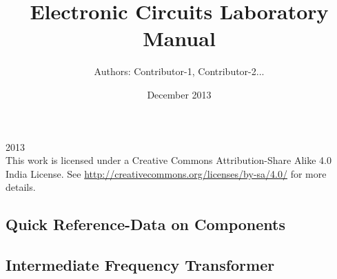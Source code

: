 \documentclass{book}
\begin{document}
\thispagestyle{empty}
\thispagestyle{empty}

\title{Electronic Circuits
Laboratory Manual}
\date{December 2013}
\author {Authors: Contributor-1, Contributor-2...}
\maketitle
  
\textcopyright{}2013
\\[5cm]
    This work is licensed under a Creative Commons Attribution-Share Alike 4.0 India License. See \url{http://creativecommons.org/licenses/by-sa/4.0/} for more details.






\thispagestyle{empty}
\tableofcontents
\thispagestyle{empty}
\thispagestyle{empty}

\listoffigures
\thispagestyle{empty}





























\begin{appendix}
\chapter {Quick Reference-Data on Components}

\section{Intermediate Frequency Transformer}
\label{IFT}



\end{appendix}
\begin{thebibliography}{1}
\bibitem{}

\end{thebibliography}
\end{document}
